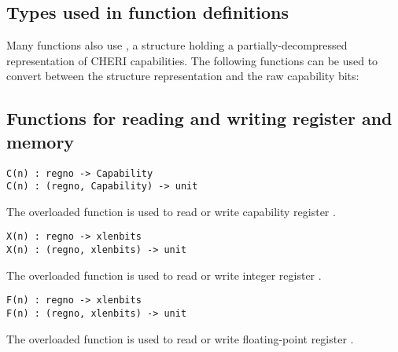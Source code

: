 \label{sailRISCVzzzeros}

\label{sailRISCVzzones}

\subsection*{Types used in function definitions}


\medskip
\noindent
Many functions also use , a structure holding a
partially-decompressed representation of CHERI capabilities.
%
The following functions can be used to convert between the structure
representation and the raw capability bits:

\medskip%

\subsection*{Functions for reading and writing register and memory}

\begin{lstlisting}[language=sail,label=sailRISCVzC]
C(n) : regno -> Capability
C(n) : (regno, Capability) -> unit
\end{lstlisting}
The overloaded function  is used to read or write capability register .

\begin{lstlisting}[language=sail,label=sailRISCVzX]
X(n) : regno -> xlenbits
X(n) : (regno, xlenbits) -> unit
\end{lstlisting}
The overloaded function  is used to read or write integer register .

\begin{lstlisting}[language=sail,label=sailRISCVzF]
F(n) : regno -> xlenbits
F(n) : (regno, xlenbits) -> unit
\end{lstlisting}
The overloaded function  is used to read or write floating-point register .


